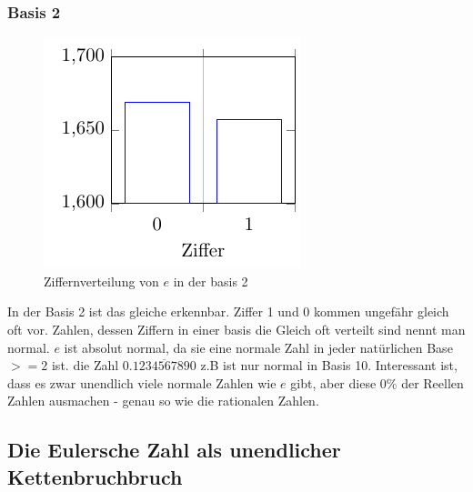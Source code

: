 \subsubsection{Basis 2}
\begin{figure}[h]
  \includegraphics{medien2/basis2/basis2.pdf}
  \centering
  \caption{Ziffernverteilung von $e$ in der basis 2}
\end{figure}
In der Basis 2 ist das gleiche erkennbar. Ziffer 1 und 0 kommen ungefähr gleich oft vor. 
Zahlen, dessen Ziffern in einer basis die Gleich oft verteilt sind nennt man normal. $e$ ist absolut normal, da sie eine normale Zahl in jeder natürlichen Base $>= 2$ ist. die Zahl $0.\overline{1234567890}$ z.B ist nur normal in Basis 10. Interessant ist, dass es zwar unendlich viele normale Zahlen wie $e$ gibt, aber diese 0\% der Reellen Zahlen ausmachen - genau so wie die rationalen Zahlen.
\subsection{Die Eulersche Zahl als unendlicher Kettenbruchbruch}

